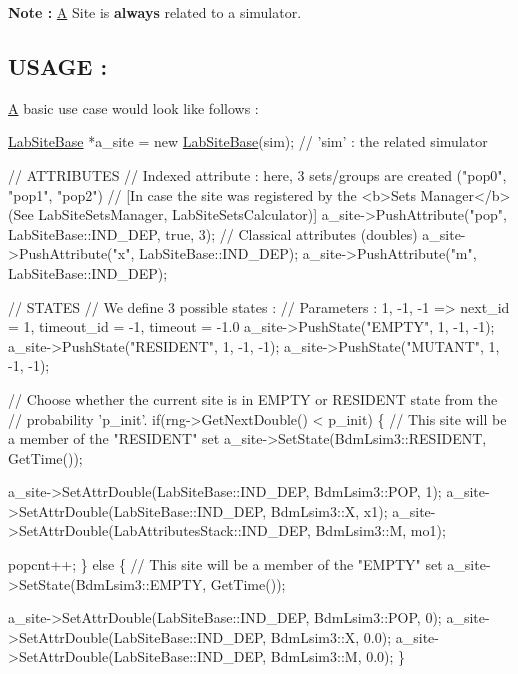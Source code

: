 {\bfseries Note \+:} \hyperlink{class_a}{A} Site is {\bfseries always} related to a simulator.

\subsection*{U\+S\+A\+G\+E \+: }

\hyperlink{class_a}{A} basic use case would look like follows \+:


\begin{DoxyCode}
\hyperlink{classelps_1_1_lab_site_base_ab051b072f05ac8a16bd51a2331c8ba8c}{LabSiteBase} *a\_site = \textcolor{keyword}{new} \hyperlink{classelps_1_1_lab_site_base_ab051b072f05ac8a16bd51a2331c8ba8c}{LabSiteBase}(sim);             \textcolor{comment}{// 'sim' : the related
       simulator}

\textcolor{comment}{// ATTRIBUTES}
\textcolor{comment}{// Indexed attribute : here, 3 sets/groups are created ("pop0", "pop1", "pop2")}
\textcolor{comment}{// [In case the site was registered by the <b>Sets Manager</b> (See LabSiteSetsManager,
       LabSiteSetsCalculator)]}
a\_site->PushAttribute(\textcolor{stringliteral}{"pop"}, LabSiteBase::IND\_DEP, \textcolor{keyword}{true}, 3);
\textcolor{comment}{// Classical attributes (doubles)}
a\_site->PushAttribute(\textcolor{stringliteral}{"x"}, LabSiteBase::IND\_DEP);
a\_site->PushAttribute(\textcolor{stringliteral}{"m"}, LabSiteBase::IND\_DEP);

\textcolor{comment}{// STATES}
\textcolor{comment}{// We define 3 possible states :}
\textcolor{comment}{// Parameters : 1, -1, -1 => next\_id = 1, timeout\_id = -1, timeout = -1.0}
a\_site->PushState(\textcolor{stringliteral}{"EMPTY"},    1, -1, -1);
a\_site->PushState(\textcolor{stringliteral}{"RESIDENT"}, 1, -1, -1);
a\_site->PushState(\textcolor{stringliteral}{"MUTANT"},   1, -1, -1);

\textcolor{comment}{// Choose whether the current site is in EMPTY or RESIDENT state from the}
\textcolor{comment}{// probability 'p\_init'.}
\textcolor{keywordflow}{if}(rng->GetNextDouble() < p\_init)
\{
        \textcolor{comment}{// This site will be a member of the "RESIDENT" set}
        a\_site->SetState(BdmLsim3::RESIDENT, GetTime());

        a\_site->SetAttrDouble(LabSiteBase::IND\_DEP, BdmLsim3::POP, 1);
        a\_site->SetAttrDouble(LabSiteBase::IND\_DEP, BdmLsim3::X, x1);
        a\_site->SetAttrDouble(LabAttributesStack::IND\_DEP, BdmLsim3::M, mo1);

        popcnt++;
\}
\textcolor{keywordflow}{else}
\{
        \textcolor{comment}{// This site will be a member of the "EMPTY" set}
        a\_site->SetState(BdmLsim3::EMPTY, GetTime());

        a\_site->SetAttrDouble(LabSiteBase::IND\_DEP, BdmLsim3::POP, 0);
        a\_site->SetAttrDouble(LabSiteBase::IND\_DEP, BdmLsim3::X, 0.0);
        a\_site->SetAttrDouble(LabSiteBase::IND\_DEP, BdmLsim3::M, 0.0);
\}
\end{DoxyCode}


